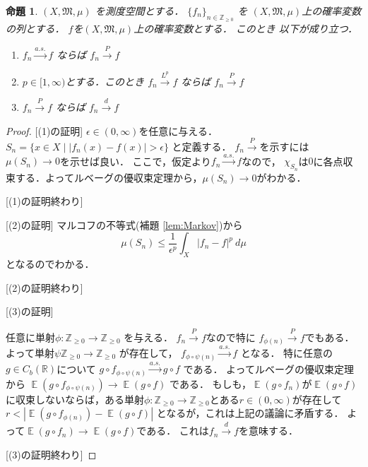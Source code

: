 \documentclass[leqno, a4paper, 12pt]{jsarticle}
\newtheorem{prop}[thm]{命題}
\newcommand{\zz}{\mathbb{Z}}
\newcommand{\rr}{\mathbb{R}}
\DeclareMathOperator{\mean}{\mathbb{E}}
\begin{document}
\begin{prop}\label{prop:333}
$(X, \mathfrak{M}, \mu)$
を測度空間とする．
$\{f_{n}\}_{n\in \zz_{\ge 0}}$
を
$(X, \mathfrak{M}, \mu)$上の確率変数の列とする．
$f$を$(X, \mathfrak{M}, \mu)$上の確率変数とする．
このとき
以下が成り立つ．
\begin{enumerate}
\item $f_{n}\xrightarrow{a.s.} f$
ならば 
$f_{n}\xrightarrow{P} f$
\item 
$p\in [1, \infty)$とする．このとき
 $f_{n}\xrightarrow{L^{p}} f$
ならば 
$f_{n}\xrightarrow{P} f$

\item $f_{n}\xrightarrow{P} f$
ならば 
$f_{n}\xrightarrow{d} f$
\end{enumerate}

\end{prop}
\begin{proof}

[(1)の証明]
$\epsilon\in (0, \infty)$を任意に与える．
$S_{n}=\{x\in X\mid |f_{n}(x)-f(x)|>\epsilon \}$
と定義する．
$f_{n}\xrightarrow{P}$を示すには
$\mu(S_{n})\to 0$を示せば良い．
ここで，仮定より$f_{n}\xrightarrow{a.s.} f$なので，
$\chi_{S_{n}}$は$0$に各点収束する．よってルベーグの優収束定理から，$\mu(S_{n})\to 0$がわかる．

[(1)の証明終わり]

[(2)の証明]
マルコフの不等式(補題 \ref{lem:Markov})から
\[
\mu(S_{n})\le \frac{1}{\epsilon^{p}}\int_{X}|f_{n}-f|^{p}\ d\mu
\]
となるのでわかる．

[(2)の証明終わり]

[(3)の証明]

任意に単射$\phi: \zz_{\ge 0}\to \zz_{\ge 0}$
を与える．
$f_{n}\xrightarrow{P} f$なので特に
$f_{\phi(n)}\xrightarrow{P} f$でもある．
よって単射$\psi\zz_{\ge 0}\to \zz_{\ge 0}$
が存在して，
$f_{\phi\circ \psi(n)}\xrightarrow{a.s.} f$
となる．
特に任意の$g\in C_{b}(\rr)$について
$g\circ f_{\phi\circ \psi(n)}\xrightarrow{a.s.} g\circ f$
である．
よってルベーグの優収束定理から
$\mean(g\circ f_{\phi\circ \psi(n)})\to \mean(g\circ f)$
である．
もしも，$\mean(g\circ f_{n})$が$\mean(g\circ f)$
に収束しないならば，ある単射$\phi:\zz_{\ge 0}\to \zz_{\ge 0}$とある$r\in (0, \infty)$が存在して
$r<|\mean(g\circ f_{\phi(n)})-\mean(g\circ f)|$
となるが，これは上記の議論に矛盾する．
よって$\mean(g\circ f_{n})\to \mean(g\circ f)$である．
これは$f_{n}\xrightarrow{d}f$を意味する．


[(3)の証明終わり]
\end{proof}
\end{document}
